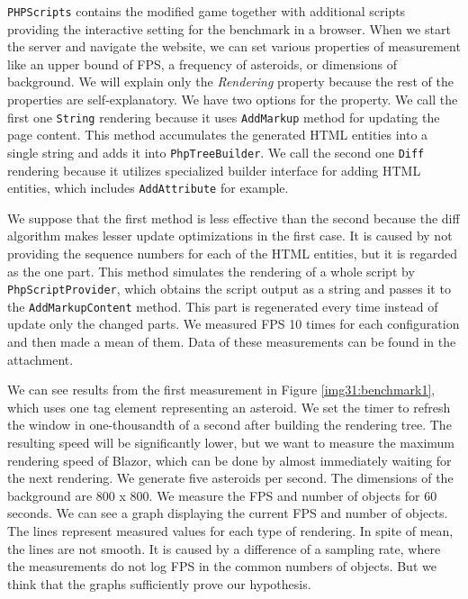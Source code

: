 \texttt{PHPScripts} contains the modified game together with additional scripts providing the interactive setting for the benchmark in a browser.
When we start the server and navigate the website, we can set various properties of measurement like an upper bound of FPS, a frequency of asteroids, or dimensions of background.
We will explain only the \textit{Rendering} property because the rest of the properties are self-explanatory.
We have two options for the property.
We call the first one \texttt{String} rendering because it uses \texttt{AddMarkup} method for updating the page content.
This method accumulates the generated HTML entities into a single string and adds it into \texttt{PhpTreeBuilder}.
We call the second one \texttt{Diff} rendering because it utilizes specialized builder interface for adding HTML entities, which includes \texttt{AddAttribute} for example.
\par
We suppose that the first method is less effective than the second because the diff algorithm makes lesser update optimizations in the first case.
It is caused by not providing the sequence numbers for each of the HTML entities, but it is regarded as the one part.
This method simulates the rendering of a whole script by \texttt{PhpScriptProvider}, which obtains the script output as a string and passes it to the \texttt{AddMarkupContent} method.
This part is regenerated every time instead of update only the changed parts.
We measured FPS 10 times for each configuration and then made a mean of them.
Data of these measurements can be found in the attachment.
\par
We can see results from the first measurement in Figure \ref{img31:benchmark1}, which uses one tag element representing an asteroid.
We set the timer to refresh the window in one-thousandth of a second after building the rendering tree.
The resulting speed will be significantly lower, but we want to measure the maximum rendering speed of Blazor, which can be done by almost immediately waiting for the next rendering. 
We generate five asteroids per second.
The dimensions of the background are 800 x 800.
We measure the FPS and number of objects for 60 seconds.
We can see a graph displaying the current FPS and number of objects.
The lines represent measured values for each type of rendering.
In spite of mean, the lines are not smooth.
It is caused by a difference of a sampling rate, where the measurements do not log FPS in the common numbers of objects.
But we think that the graphs sufficiently prove our hypothesis.
\par
